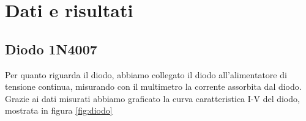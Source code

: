 \section*{Dati e risultati}

\subsection*{Diodo 1N4007}

Per quanto riguarda il diodo, abbiamo collegato il diodo all'alimentatore di tensione continua,
misurando con il multimetro la corrente assorbita dal diodo. Grazie ai dati misurati abbiamo graficato
la curva caratteristica I-V del diodo, mostrata in figura \ref{fig:diodo}
